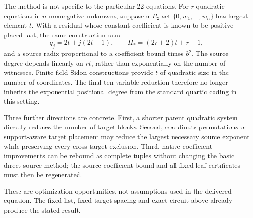 \documentclass[11pt,letterpaper]{article}
\theoremstyle{definition}\newtheorem{definition}[theorem]{Definition}
\theoremstyle{remark}\newtheorem{remark}[theorem]{Remark}
\begin{document}
The method is not specific to the particular 22 equations. For $r$ quadratic equations in $n$ nonnegative unknowns, suppose a $B_2$ set $\{0,w_1,\ldots,w_n\}$ has largest element $t$. With a residual whose constant coefficient is known to be positive placed last, the same construction uses
\[
 q_j=2t+j(2t+1),\qquad H_*=(2r+2)t+r-1,
\]
and a source radix proportional to a coefficient bound times $b^2$. The source degree depends linearly on $rt$, rather than exponentially on the number of witnesses. Finite-field Sidon constructions provide $t$ of quadratic size in the number of coordinates. The final ten-variable reduction therefore no longer inherits the exponential positional degree from the standard quartic coding in this setting.

Three further directions are concrete. First, a shorter parent quadratic system directly reduces the number of target blocks. Second, coordinate permutations or support-aware target placement may reduce the largest necessary source exponent while preserving every cross-target exclusion. Third, native coefficient improvements can be rebound as complete tuples without changing the basic direct-source method; the source coefficient bound and all fixed-leaf certificates must then be regenerated.

These are optimization opportunities, not assumptions used in the delivered equation. The fixed list, fixed target spacing and exact circuit above already produce the stated result.
\end{document}
